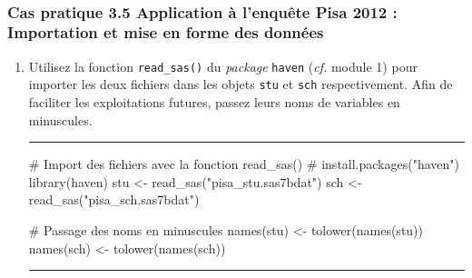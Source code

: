 \documentclass[12pt,twosided, notitlepage]{book}
\newenvironment{Shaded}{}{}
\newcommand{\KeywordTok}[1]{\textcolor[rgb]{0.00,0.00,1.00}{{#1}}}
\newcommand{\StringTok}[1]{\textcolor[rgb]{0.00,0.50,0.50}{{#1}}}
\newcommand{\CommentTok}[1]{\textcolor[rgb]{0.00,0.50,0.00}{{#1}}}
\newcommand{\NormalTok}[1]{{#1}}
\newif \ifsol
\renewenvironment{Shaded}{\begin{snugshade}}{\end{snugshade}}
\begin{document}
~

\subsubsection{\texorpdfstring{\textbf{Cas pratique 3.5} Application à
l'enquête Pisa 2012 : Importation et mise en forme des
données}{Cas pratique 3.5 Application à l'enquête Pisa 2012 : Importation et mise en forme des données}}\label{cas-pratique-3.5-application-a-lenquete-pisa-2012-importation-et-mise-en-forme-des-donnees}


\begin{enumerate}
\def\labelenumi{\alph{enumi}.}
\item
  Utilisez la fonction \texttt{read\_sas()} du
  \emph{package} \texttt{haven} (\emph{cf.} module 1) pour importer les
  deux fichiers dans les objets \texttt{stu} et \texttt{sch}
  respectivement. Afin de faciliter les exploitations futures, passez
  leurs noms de variables en minuscules.

  \ifsol 

  \begin{center} \rule{0.5\linewidth}{\linethickness}\end{center}

\begin{Shaded}
\begin{Highlighting}[]
\CommentTok{# Import des fichiers avec la fonction read_sas()}
\CommentTok{# install.packages("haven")}
\KeywordTok{library}\NormalTok{(haven)}
\NormalTok{stu <-}\StringTok{ }\KeywordTok{read_sas}\NormalTok{(}\StringTok{"pisa_stu.sas7bdat"}\NormalTok{)}
\NormalTok{sch <-}\StringTok{ }\KeywordTok{read_sas}\NormalTok{(}\StringTok{"pisa_sch.sas7bdat"}\NormalTok{)}

\CommentTok{# Passage des noms en minuscules}
\KeywordTok{names}\NormalTok{(stu) <-}\StringTok{ }\KeywordTok{tolower}\NormalTok{(}\KeywordTok{names}\NormalTok{(stu))}
\KeywordTok{names}\NormalTok{(sch) <-}\StringTok{ }\KeywordTok{tolower}\NormalTok{(}\KeywordTok{names}\NormalTok{(sch))}
\end{Highlighting}
\end{Shaded}

  \begin{center} \rule{0.5\linewidth}{\linethickness}\end{center}


\end{enumerate}
\end{document}
